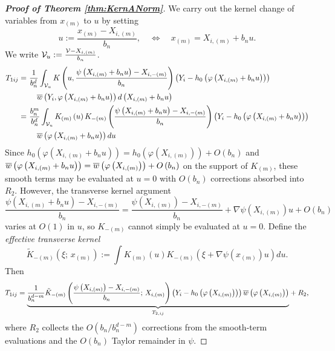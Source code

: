 \documentclass[12pt,american]{article}
\theoremstyle{definition}
\theoremstyle{plain}
\theoremstyle{definition}
\theoremstyle{plain}
\theoremstyle{plain}
\theoremstyle{plain}
\theoremstyle{plain}
\theoremstyle{plain}
\begin{document}
\begin{proof}[\textbf{Proof of Theorem \ref{thm:KernANorm}}]
We carry out the kernel change of variables from $x_{\left(m\right)}$
to $u$ by setting
\[
u:=\frac{x_{\left(m\right)}-X_{i,\left(m\right)}}{b_{n}},\quad\iff\quad x_{\left(m\right)}=X_{i,\left(m\right)}+b_{n}u.
\]
We write ${\cal V}_{u}:=\frac{{\cal V}-X_{i,\left(m\right)}}{b_{n}}$.
\begin{align*}
T_{1ij}=\  & \frac{1}{b_{n}^{d}}\int_{{\cal V}_{u}}K\left(u,\frac{\psi\left(X_{i,\left(m\right)}+b_{n}u\right)-X_{i,-\left(m\right)}}{b_{n}}\right)\left(Y_{i}-h_{0}\left(\varphi\left(X_{i,\left(m\right)}+b_{n}u\right)\right)\right)\\
& \quad \overline{w}\left(Y_{i},\varphi\left(X_{i,\left(m\right)}+b_{n}u\right)\right)d\left(X_{i,\left(m\right)}+b_{n}u\right)\\
=\  & \frac{b_{n}^{m}}{b_{n}^{d}}\int_{{\cal V}_{u}}K_{\left(m\right)}\left(u\right)K_{-\left(m\right)}\left(\frac{\psi\left(X_{i,\left(m\right)}+b_{n}u\right)-X_{i,-\left(m\right)}}{b_{n}}\right)\left(Y_{i}-h_{0}\left(\varphi\left(X_{i,\left(m\right)}+b_{n}u\right)\right)\right)\\
&\quad \overline{w}\left(\varphi\left(X_{i,\left(m\right)}+b_{n}u\right)\right)du\\
\end{align*}
Since $h_{0}\left(\varphi\left(X_{i,\left(m\right)}+b_{n}u\right)\right)=h_{0}\left(\varphi\left(X_{i,\left(m\right)}\right)\right)+O\left(b_{n}\right)$
and $\overline{w}\left(\varphi\left(X_{i,\left(m\right)}+b_{n}u\right)\right)=\overline{w}\left(\varphi\left(X_{i,\left(m\right)}\right)\right)+O\left(b_{n}\right)$
on the support of $K_{\left(m\right)}$, these smooth terms may be evaluated at $u=0$
with $O\left(b_{n}\right)$ corrections absorbed into $R_{2}$.
However, the transverse kernel argument
\[
\frac{\psi\left(X_{i,\left(m\right)}+b_{n}u\right)-X_{i,-\left(m\right)}}{b_{n}}
=\frac{\psi\left(X_{i,\left(m\right)}\right)-X_{i,-\left(m\right)}}{b_{n}}+\nabla\psi\left(X_{i,\left(m\right)}\right)u+O\left(b_{n}\right)
\]
varies at $O\left(1\right)$ in $u$, so $K_{-\left(m\right)}$ cannot simply be evaluated at $u=0$.
Define the \emph{effective transverse kernel}
\begin{equation}\label{eq:eff_kernel}
\tilde{K}_{-\left(m\right)}\left(\xi;\,x_{\left(m\right)}\right)
:=\int K_{\left(m\right)}\left(u\right)K_{-\left(m\right)}\left(\xi+\nabla\psi\left(x_{\left(m\right)}\right)u\right)du.
\end{equation}
Then
\[
T_{1ij}=\underset{T_{2,ij}}{\underbrace{\frac{1}{b_{n}^{d-m}}\tilde{K}_{-\left(m\right)}\left(\frac{\psi\left(X_{i,\left(m\right)}\right)-X_{i,-\left(m\right)}}{b_{n}};\,X_{i,\left(m\right)}\right)\left(Y_{i}-h_{0}\left(\varphi\left(X_{i,\left(m\right)}\right)\right)\right)\overline{w}\left(\varphi\left(X_{i,\left(m\right)}\right)\right)}}+R_{2},
\]
where $R_{2}$ collects the $O\left(b_{n}/b_{n}^{d-m}\right)$ corrections from the smooth-term
evaluations and the $O\left(b_{n}\right)$ Taylor remainder in $\psi$.


\end{proof}
\end{document}
